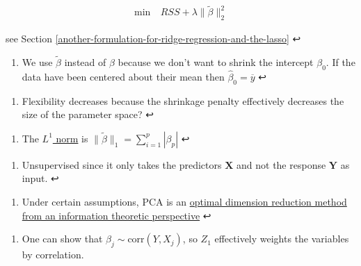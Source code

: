 \documentclass[11pt]{article}
\providecommand{\tightlist}{%
      \setlength{\itemsep}{0pt}\setlength{\parskip}{0pt}}
\begin{document}
\[
\begin{align*}
\min&\ RSS + \lambda\| \tilde{\beta} \|_2^2
\end{align*}
\]

see Section \ref{another-formulation-for-ridge-regression-and-the-lasso}
↩

\hypertarget{foot47}{}
\begin{enumerate}
\def\labelenumi{\arabic{enumi}.}
\setcounter{enumi}{46}
\tightlist
\item
  We use \(\tilde{\beta}\) instead of \(\beta\) because we don't want to
  shrink the intercept \(\beta_0\). If the data have been centered about
  their mean then \(\hat{\beta}_0 = \overline{y}\) ↩
\end{enumerate}

\hypertarget{foot48}{}
\begin{enumerate}
\def\labelenumi{\arabic{enumi}.}
\setcounter{enumi}{47}
\tightlist
\item
  Flexibility decreases because the shrinkage penalty effectively
  decreases the size of the parameter space? ↩
\end{enumerate}

\hypertarget{foot49}{}
\begin{enumerate}
\def\labelenumi{\arabic{enumi}.}
\setcounter{enumi}{48}
\tightlist
\item
  The \href{https://en.wikipedia.org/wiki/Taxicab_geometry}{\(L^1\)
  norm} is \(\|\tilde{\beta}\|_1 = \sum_{i=1}^p |\beta_p|\) ↩
\end{enumerate}

\hypertarget{foot50}{}
\begin{enumerate}
\def\labelenumi{\arabic{enumi}.}
\setcounter{enumi}{49}
\tightlist
\item
  Unsupervised since it only takes the predictors \(\mathbf{X}\) and not
  the response \(\mathbf{Y}\) as input. ↩
\end{enumerate}

\hypertarget{foot51}{}
\begin{enumerate}
\def\labelenumi{\arabic{enumi}.}
\setcounter{enumi}{50}
\tightlist
\item
  Under certain assumptions, PCA is an
  \href{https://en.wikipedia.org/wiki/Principal_component_analysis\#PCA_and_information_theory}{optimal
  dimension reduction method from an information theoretic perspective}
  ↩
\end{enumerate}

\hypertarget{foot52}{}
\begin{enumerate}
\def\labelenumi{\arabic{enumi}.}
\setcounter{enumi}{51}
\tightlist
\item
  One can show that \(\hat{\beta}_j \sim \text{corr}(Y, X_j)\), so
  \(Z_1\) effectively weights the variables by correlation.
\end{enumerate}
\end{document}
